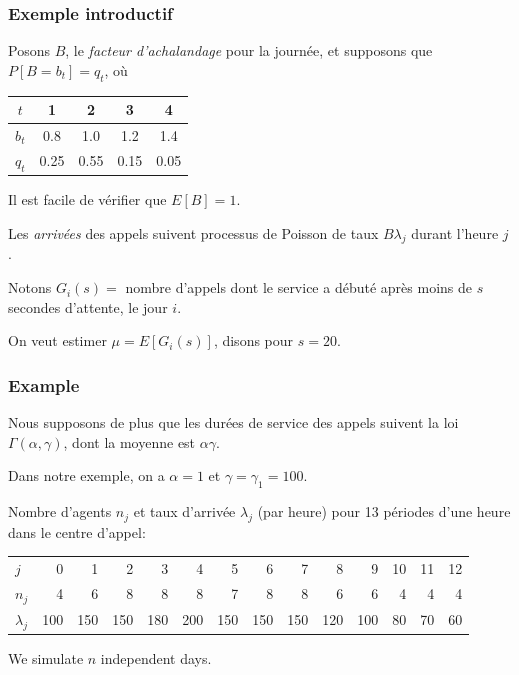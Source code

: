 \documentclass[t,usepdftitle=false]{beamer}
\begin{document}
\begin{frame}
	\frametitle{Exemple introductif}
	
	Posons ${B}$, le \emph{facteur d'achalandage} pour la journée, et
	supposons que $P[B = b_t] = q_t$, o\`u
	\begin{center}
		\begin{tabular}{c|cccc}
			${t}$   &   1  &  2   &   3  &  4  \\  
			\hline
			${b_t}$ &  0.8 &  1.0 &  1.2 &  1.4 \\
			${q_t}$ & 0.25 & 0.55 & 0.15 & 0.05 \\
		\end{tabular}
	\end{center}
	
	\mbox{}
	
	Il est facile de vérifier que $E[B] = 1$. %
	
	\mbox{}
	
	Les \emph{arrivées} des appels suivent processus de Poisson de taux
	$B{\lambda_j}$ durant l'heure $j$.
	
	\mbox{}
	
	Notons ${G_i(s)}=$ nombre d'appels dont le service a débuté
	après moins de ${s}$ secondes d'attente, le jour $i$.
	
	\mbox{}
	
	On veut estimer ${\mu} = E[G_i(s)]$, disons pour ${s=20}$.
	
\end{frame}

\begin{frame}
	\frametitle{Example}
	
	Nous supposons de plus que les durées de service des appels suivent la loi
	$\Gamma(\alpha,\gamma)$, dont la moyenne est $\alpha\gamma$.
	
	\mbox{}
	
	Dans notre exemple, on a $\alpha = 1$ et $\gamma = {\gamma_1} = 100$.
	
	\mbox{}
	
	Nombre d'agents $n_j$ et taux d'arrivée $\lambda_j$ (par heure) pour 13 périodes d'une heure dans le centre d'appel:
	
	\begin{footnotesize}
		\hspace*{-1cm}
		\begin{tabular}{l|rrrrrrrrrrrrr}
			\hline
			$j$   & 0 & 1 & 2 & 3 & 4 & 5 & 6 & 7 & 8 & 9 & 10 & 11 & 12 \\
			$n_j$ & 4 & 6 & 8 & 8 & 8 & 7 & 8 & 8 & 6 &  6 &  4 &  4 &  4 \\
			$\lambda_j$ & 100 & 150 & 150 & 180 & 200 & 150 & 150 & 150 & 
			120 & 100 & 80 & 70 & 60 \\
			\hline
		\end{tabular}
	\end{footnotesize}
	
	\mbox{}
	
	We simulate ${n}$ independent days.
	
\end{frame}
\end{document}
